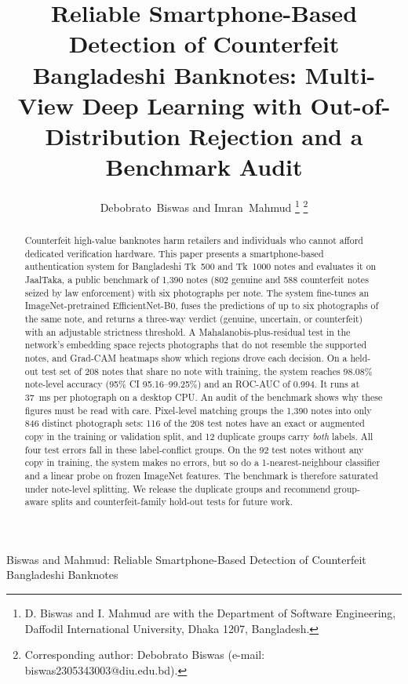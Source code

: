 \documentclass[journal]{IEEEtran}
\begin{document}
\title{Reliable Smartphone-Based Detection of Counterfeit Bangladeshi Banknotes:
Multi-View Deep Learning with Out-of-Distribution Rejection and a Benchmark Audit}

\author{Debobrato~Biswas and Imran~Mahmud%
\thanks{D. Biswas and I. Mahmud are with the Department of Software Engineering,
Daffodil International University, Dhaka 1207, Bangladesh.}%
\thanks{Corresponding author: Debobrato Biswas (e-mail: biswas2305343003@diu.edu.bd).}}

%
{Biswas and Mahmud: Reliable Smartphone-Based Detection of Counterfeit Bangladeshi Banknotes}

\maketitle

\begin{abstract}
Counterfeit high-value banknotes harm retailers and individuals who cannot afford
dedicated verification hardware. This paper presents a smartphone-based authentication
system for Bangladeshi Tk~500 and Tk~1000 notes and evaluates it on JaalTaka, a public
benchmark of 1{,}390 notes (802 genuine and 588 counterfeit notes seized by law
enforcement) with six photographs per note. The system fine-tunes an ImageNet-pretrained
EfficientNet-B0, fuses the predictions of up to six photographs of the same note, and
returns a three-way verdict (genuine, uncertain, or counterfeit) with an adjustable
strictness threshold. A Mahalanobis-plus-residual test in the network's embedding space
rejects photographs that do not resemble the supported notes, and Grad-CAM heatmaps show
which regions drove each decision. On a held-out test set of 208 notes that share no note
with training, the system reaches 98.08\% note-level accuracy (95\% CI 95.16--99.25\%)
and an ROC-AUC of 0.994. It runs at 37~ms per photograph on a desktop CPU. An audit of the
benchmark shows why these figures must be read with care. Pixel-level matching groups the
1{,}390 notes into only 846 distinct photograph sets: 116 of the 208 test notes have an
exact or augmented copy in the training or validation split, and 12 duplicate groups carry
\emph{both} labels. All four test errors fall in these label-conflict groups. On the 92 test
notes without any copy in training, the system makes no errors, but so do a
1-nearest-neighbour classifier and a linear probe on frozen ImageNet features. The
benchmark is therefore saturated under note-level splitting. We release the duplicate
groups and recommend group-aware splits and counterfeit-family hold-out tests for future
work.
\end{abstract}
\end{document}
